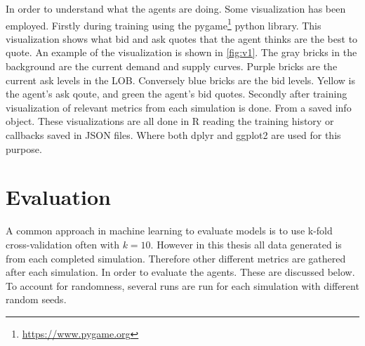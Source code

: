 \documentclass{kththesis}
\theoremstyle{definition}
\begin{document}
In order to understand what the agents are doing. Some visualization has been employed. Firstly during training using the pygame\footnote{\url{https://www.pygame.org}} python library. This visualization shows what bid and ask quotes that the agent thinks are the best to quote. An example of the visualization is shown in \autoref{fig:v1}. The gray bricks in the background are the current demand and supply curves. Purple bricks are the current ask levels in the LOB. Conversely blue bricks are the bid levels. Yellow is the agent's ask qoute, and green the agent's bid quotes. Secondly after training visualization of relevant metrics from each simulation is done. From a saved info object. 
\newpage
These visualizations are all done in R reading the training history or callbacks saved in JSON files. Where both dplyr \parencite{dplyr} and ggplot2 \parencite{ggfplot2} are used for this purpose.

\section{Evaluation}
A common approach in machine learning to evaluate models is to use k-fold cross-validation often with $k=10$. However in this thesis all data generated is from each completed simulation. Therefore other different metrics are gathered after each simulation. In order to evaluate the agents. These are discussed below. To account for randomness, several runs are run for each simulation with different random seeds. 
\end{document}
